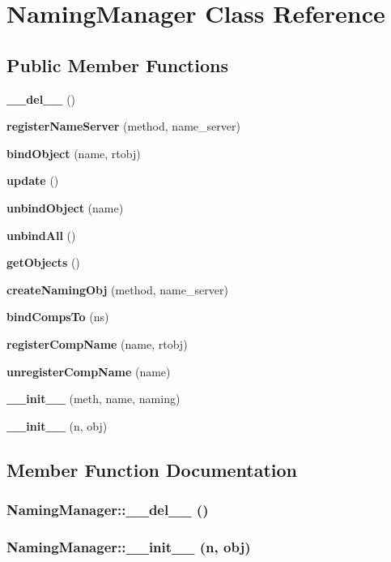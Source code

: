 \section{Naming\-Manager Class Reference}
\label{classNamingManager}
\subsection*{Public Member Functions}
\begin{CompactItemize}
\item 
{\bf \_\-\_\-del\_\-\_\-} ()
\item 
{\bf register\-Name\-Server} (method, name\_\-server)
\item 
{\bf bind\-Object} (name, rtobj)
\item 
{\bf update} ()
\item 
{\bf unbind\-Object} (name)
\item 
{\bf unbind\-All} ()
\item 
{\bf get\-Objects} ()
\item 
{\bf create\-Naming\-Obj} (method, name\_\-server)
\item 
{\bf bind\-Comps\-To} (ns)
\item 
{\bf register\-Comp\-Name} (name, rtobj)
\item 
{\bf unregister\-Comp\-Name} (name)
\item 
{\bf \_\-\_\-init\_\-\_\-} (meth, name, naming)
\item 
{\bf \_\-\_\-init\_\-\_\-} (n, obj)
\end{CompactItemize}


\subsection{Member Function Documentation}
\subsubsection{\setlength{\rightskip}{0pt plus 5cm}Naming\-Manager::\_\-\_\-del\_\-\_\- ()}\label{classNamingManager_NamingManagera0}


\subsubsection{\setlength{\rightskip}{0pt plus 5cm}Naming\-Manager::\_\-\_\-init\_\-\_\- (n, obj)}\label{classNamingManager_NamingManagera12}


